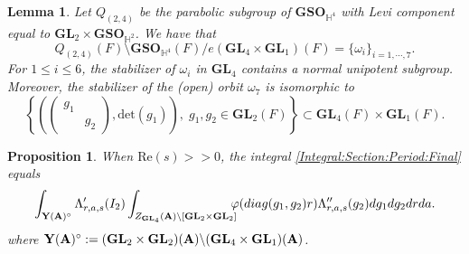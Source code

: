 \documentclass[10pt,a4paper]{amsart}
\newtheorem{proposition}{Proposition}
\newtheorem{lemma}{Lemma}
\def\A{{\bf A}}
\def\GL{\mathbf{GL}}
\begin{document}
\begin{lemma}\label{Final:Double:Quotient}
    Let $Q_{(2,4)}$ be the parabolic subgroup of $\mathbf{GSO}_{\mathbb{H}^4}$ with Levi component equal to $\GL_2\times \mathbf{GSO}_{\mathbb{H}^2}$. We have that 
    \[Q_{(2,4)}(F)\setminus \mathbf{GSO}_{\mathbb{H}^4}(F)/e(\GL_4\times \GL_1)(F) = \{\omega_i\}_{i = 1,\cdots,7}.\]
    For $1\leq i \leq 6$, the stabilizer of $\omega_i$ in $\GL_4$ contains a normal unipotent subgroup. Moreover, the stabilizer of the (open) orbit $ \omega_7$ is isomorphic to   \[\left\{\left(\left(\begin{smallmatrix}g_1& \\ &g_2\end{smallmatrix}\right),\mathrm{det}(g_1)\right),\;g_1,g_2\in \GL_2(F)\right\}\subset \GL_4(F)\times \GL_1(F).\]
\end{lemma}

\begin{proposition}\label{Unfolding:Spherical:Period} When $\mathrm{Re}(s)>>0$, the integral \eqref{Integral:Section:Period:Final} equals 
      \begin{align*}
        \int_{ \mathbf{Y}(\A)^\circ } \Lambda_{r,a,s}'(I_2)\int_{Z_{\GL_4}(\A)\backslash [\GL_2\times \GL_2]} \!\!\!\!\varphi({\rm diag}(g_1,g_2) r) \Lambda''_{r,a,s}(g_2) dg_1dg_2drda.  
             \end{align*}
   where  $\mathbf{Y}(\A)^\circ :=  (\GL_2 \times \GL_2)(\A) \backslash (\GL_4 \times \GL_1)(\A)$.
\end{proposition}
\end{document}
